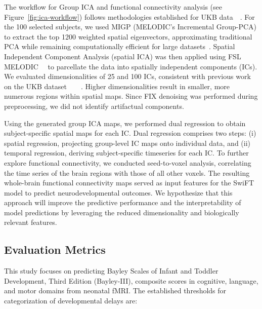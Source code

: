 \documentclass[runningheads,a4paper]{llncs}
\begin{document}
The workflow for Group ICA and functional connectivity analysis (see Figure~\ref{fig:ica-workflow}) follows methodologies established for UKB data~\cite{ALFAROALMAGRO2018400}~\cite{Miller2016}. For the 100 selected subjects, we used MIGP (MELODIC's Incremental Group-PCA) to extract the top 1200 weighted spatial eigenvectors, approximating traditional PCA while remaining computationally efficient for large datasets~\cite{Smith2014}. Spatial Independent Component Analysis (spatial ICA) was then applied using FSL MELODIC~\cite{Hyvarinen1999}~\cite{Beckmann2004} to parcellate the data into spatially independent components (ICs). We evaluated dimensionalities of 25 and 100 ICs, consistent with previous work on the UKB dataset~\cite{ALFAROALMAGRO2018400}~\cite{Miller2016}~\cite{SMITH2013144}~\cite{doi}. Higher dimensionalities result in smaller, more numerous regions within spatial maps. Since FIX denoising was performed during preprocessing, we did not identify artifactual components.
%

Using the generated group ICA maps, we performed dual regression to obtain subject-specific spatial maps for each IC. Dual regression comprises two steps: (i) spatial regression, projecting group-level IC maps onto individual data, and (ii) temporal regression, deriving subject-specific timeseries for each IC. To further explore functional connectivity, we conducted seed-to-voxel analysis, correlating the time series of the brain regions with those of all other voxels. The resulting whole-brain functional connectivity maps served as input features for the SwiFT model to predict neurodevelopmental outcomes. We hypothesize that this approach will improve the predictive performance and the interpretability of model predictions by leveraging the reduced dimensionality and biologically relevant features.

\subsection{Evaluation Metrics}
\label{sec:evaluation_metrics}

This study focuses on predicting Bayley Scales of Infant and Toddler Development, Third Edition (Bayley-III), composite scores in cognitive, language, and motor domains from neonatal fMRI. The established thresholds for categorization of developmental delays are:
\end{document}
